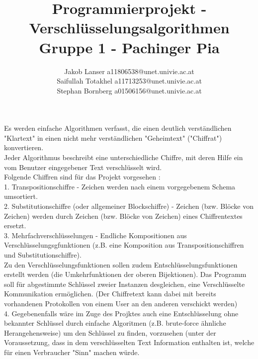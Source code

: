 \documentclass{article}
\title{Programmierprojekt - Verschlüsselungsalgorithmen\\Gruppe 1 -  Pachinger Pia}
\author{Jakob Lanser a11806538@unet.univie.ac.at\\Saifullah Totakhel a11713253@unet.univie.ac.at\\Stephan Bornberg a01506156@unet.univie.ac.at}
\begin{document}
\maketitle

Es werden einfache Algorithmen verfasst, die einen deutlich verständlichen "Klartext" in einen nicht mehr verständlichen "Geheimtext" ("Chiffrat") konvertieren.\\
Jeder Algorithmus beschreibt eine unterschiedliche Chiffre, mit deren Hilfe ein vom Benutzer eingegebener Text verschlüsselt wird.\\
Folgende Chiffren sind für das Projekt vorgesehen :\\
1. Transpositionschiffre - Zeichen werden nach einem vorgegebenem Schema umsortiert.\\
2. Substitutionschiffre (oder allgemeiner Blockschiffre) - Zeichen (bzw. Blöcke von Zeichen) werden durch Zeichen (bzw. Blöcke von Zeichen) eines Chiffrentextes ersetzt.\\
3. Mehrfachverschlüsselungen - Endliche Kompositionen aus Verschlüsselungsgfunktionen (z.B. eine Komposition aus Transpositionschiffren und Substitutionschiffre).\\

Zu den Verschlüsselungsfunktionen sollen zudem Entschlüsselungsfunktionen erstellt werden (die Umkehrfunktionen der oberen Bijektionen). Das Programm soll für abgestimmte Schlüssel zweier Instanzen desgleichen, eine Verschlüsselte Kommunikation ermöglichen. (Der Chiffretext kann dabei mit bereits vorhandenen Protokollen von einem User an den anderen verschickt werden)\\

4. Gegebenenfalls wäre im Zuge des Projktes auch eine Entschlüsselung ohne bekannter Schlüssel durch einfache Algoritmen (z.B. brute-force ähnliche Herangehensweise) um den Schlüssel zu finden, vorzusehen (unter der Voraussetzung, dass in dem verschlüsselten Text Information enthalten ist, welche für einen Verbraucher "Sinn" machen würde. 
\end{document}
